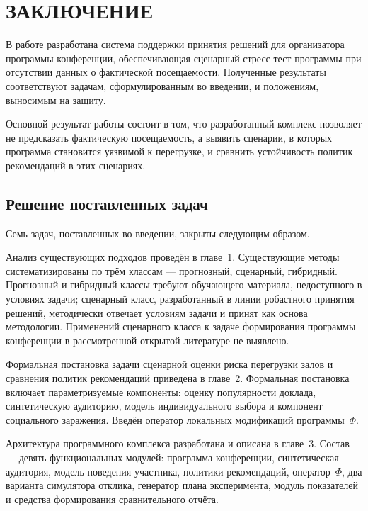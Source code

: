 \chapter*{ЗАКЛЮЧЕНИЕ}
\sloppy

В работе разработана система поддержки принятия решений для организатора программы конференции, обеспечивающая сценарный стресс-тест программы при отсутствии данных о фактической посещаемости. Полученные результаты соответствуют задачам, сформулированным во введении, и положениям, выносимым на защиту.

Основной результат работы состоит в том, что разработанный комплекс позволяет не предсказать фактическую посещаемость, а выявить сценарии, в которых программа становится уязвимой к перегрузке, и сравнить устойчивость политик рекомендаций в этих сценариях.


\section*{Решение поставленных задач}

Семь задач, поставленных во введении, закрыты следующим образом.

Анализ существующих подходов проведён в главе~1. Существующие методы систематизированы по трём классам --- прогнозный, сценарный, гибридный. Прогнозный и гибридный классы требуют обучающего материала, недоступного в условиях задачи; сценарный класс, разработанный в линии робастного принятия решений, методически отвечает условиям задачи и принят как основа методологии. Применений сценарного класса к задаче формирования программы конференции в рассмотренной открытой литературе не выявлено.

Формальная постановка задачи сценарной оценки риска перегрузки залов и сравнения политик рекомендаций приведена в главе~2. Формальная постановка включает параметризуемые компоненты: оценку популярности доклада, синтетическую аудиторию, модель индивидуального выбора и компонент социального заражения. Введён оператор локальных модификаций программы~$\Phi$.

Архитектура программного комплекса разработана и описана в главе~3. Состав --- девять функциональных модулей: программа конференции, синтетическая аудитория, модель поведения участника, политики рекомендаций, оператор~$\Phi$, два варианта симулятора отклика, генератор плана эксперимента, модуль показателей и средства формирования сравнительного отчёта.

